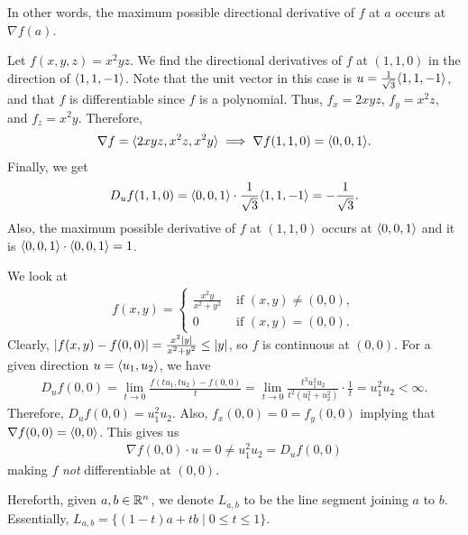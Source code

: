 In other words, the maximum possible directional derivative of $f$ at $a$ occurs at $\nabla f(a)$.

\begin{example}
    Let $f(x,y,z) = x^{2}yz$. We find the directional derivatives of $f$ at $(1,1,0)$ in the direction of $\langle1,1,-1\rangle$. Note that the unit vector in this case is $u = \frac{1}{\sqrt{3}}\langle1,1,-1\rangle$, and that $f$ is differentiable since $f$ is a polynomial. Thus, $f_{x} = 2xyz$, $f_{y} = x^{2}z$, and $f_{z} = x^{2}y$. Therefore,
    \begin{align}
        \nabla f = \langle2xyz, x^{2}z, x^{2}y\rangle \implies \nabla f (1,1,0) = \langle0,0,1\rangle.
    \end{align}
    Finally, we get
    \begin{align}
        D_{u}f(1,1,0) = \langle0,0,1\rangle \cdot \frac{1}{\sqrt{3}} \langle1,1,-1\rangle = -\frac{1}{\sqrt{3}}.
    \end{align}
    Also, the maximum possible derivative of $f$ at $(1,1,0)$ occurs at $\langle0,0,1\rangle$ and it is $\langle0,0,1\rangle \cdot \langle0,0,1\rangle = 1$.
\end{example}

\begin{example}
    We look at
    \begin{align}
        f(x,y) = \begin{cases}
            \frac{x^{2}y}{x^{2}+y^{2}} &\text{ if } (x,y) \neq (0,0),\\
            0 &\text{ if } (x,y) = (0,0).
        \end{cases}
    \end{align}
    Clearly, $\left| f(x,y) - f(0,0) \right| = \frac{x^{2}\left| y \right|}{x^{2}+y^{2}} \leq \left| y \right|$, so $f$ is continuous at $(0,0)$. For a given direction $u = \langle u_{1},u_{2}\rangle$, we have
    \begin{align}
        D_{u}f(0,0) = \lim_{t \to 0} \frac{f(tu_{1},tu_{2})-f(0,0)}{t} = \lim_{t \to 0} \frac{t^{3}u_{1}^{2}u_{2}}{t^{2}(u_{1}^{2}+u_{2}^{2})} \cdot \frac{1}{t} = u_{1}^{2}u_{2} < \infty.
    \end{align}
    Therefore, $D_{u}f(0,0) = u_{1}^{2}u_{2}$. Also, $f_{x}(0,0) = 0 = f_{y}(0,0)$ implying that $\nabla f(0,0) = \langle0,0\rangle$. This gives us
    \begin{align}
        \nabla f(0,0) \cdot u = 0 \neq u_{1}^{2}u_{2} = D_{u}f(0,0)
    \end{align}
    making $f$ \textit{not} differentiable at $(0,0)$.
\end{example}

Hereforth, given $a,b \in \mathbb{R}^{n}$, we denote $L_{a,b}$ to be the line segment joining $a$ to $b$. Essentially, $L_{a,b} = \{(1-t)a + tb \mid 0 \leq t \leq 1\}$.

